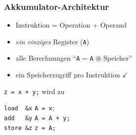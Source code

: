 \documentclass[t,aspectratio=169,usenames,dvipsnames]{beamer}
\begin{document}





\begin{frame}
  \frametitle{Akkumulator-Architektur}

  \begin{itemize}
  \item Instruktion = Operation + Operand
  \item \emph{ein einziges} Register (\texttt{A})
  \item alle Berechnungen \enquote{\texttt{A} = \texttt{A} $\circledast$ Speicher}
  \item ein Speicherzugriff pro Instruktion $\checkmark$
  \end{itemize}

  \bigskip

  \texttt{z = x + y;} wird zu

  \bigskip

  {\Large
    \texttt{load~~\&x} \qquad \texttt{A = x};\\
    \texttt{add~~~\&y} \qquad \texttt{A = A + y;}\\
    \texttt{store~\&z} \qquad \texttt{z = A;}\\
  }
\end{frame}
\end{document}
